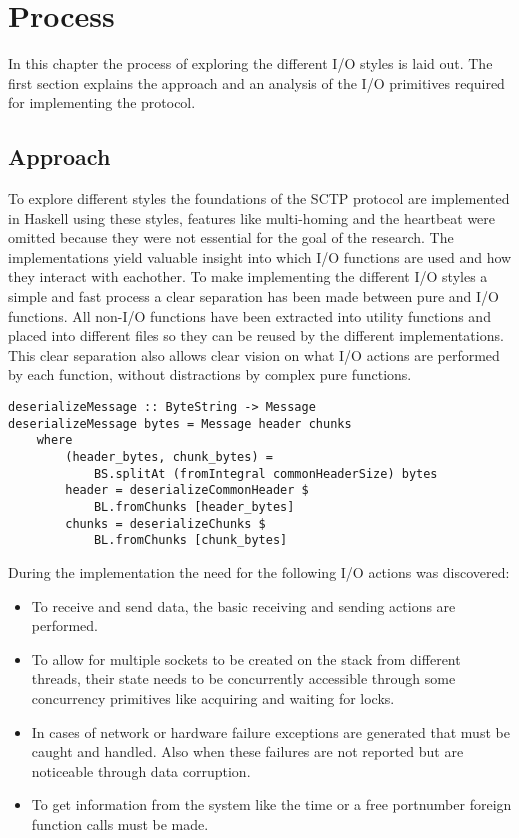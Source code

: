 \chapter{Process}
In this chapter the process of exploring the different I/O styles is laid out. The first section explains the approach and an analysis of the I/O primitives required for implementing the protocol.

\section{Approach}
To explore different styles the foundations of the SCTP protocol\cite{_rfc_????} are implemented in Haskell using these styles, features like multi-homing and the heartbeat were omitted because they were not essential for the goal of the research. The implementations yield valuable insight into which I/O functions are used and how they interact with eachother.
To make implementing the different I/O styles a simple and fast process a clear separation has been made between pure and I/O functions. All non-I/O functions have been extracted into utility functions and placed into different files so they can be reused by the different implementations. This clear separation also allows clear vision on what I/O actions are performed by each function, without distractions by complex pure functions.

\begin{lstlisting}[caption={An example of a shared pure function}, label={lst:shared}]
deserializeMessage :: ByteString -> Message
deserializeMessage bytes = Message header chunks
    where
        (header_bytes, chunk_bytes) =
            BS.splitAt (fromIntegral commonHeaderSize) bytes
        header = deserializeCommonHeader $
            BL.fromChunks [header_bytes]
        chunks = deserializeChunks $
            BL.fromChunks [chunk_bytes]
\end{lstlisting}

During the implementation the need for the following I/O actions was discovered:

\begin{itemize}

\item To receive and send data, the basic receiving and sending actions are performed.

\item To allow for multiple sockets to be created on the stack from different threads, their state needs to be concurrently accessible through some concurrency primitives like acquiring and waiting for locks.

\item In cases of network or hardware failure exceptions are generated that must be caught and handled. Also when these failures are not reported but are noticeable through data corruption.

\item To get information from the system like the time or a free portnumber foreign function calls must be made.
\end{itemize}


